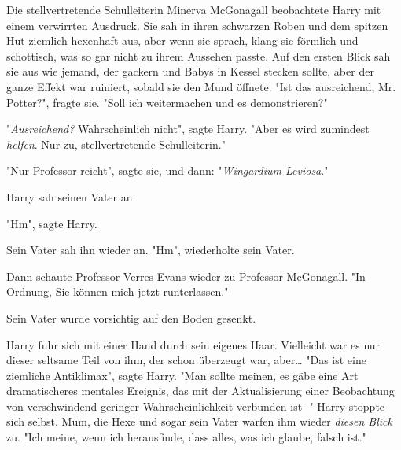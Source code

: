 Die stellvertretende Schulleiterin Minerva McGonagall beobachtete Harry mit einem verwirrten Ausdruck. Sie sah in ihren schwarzen Roben und dem spitzen Hut ziemlich hexenhaft aus, aber wenn sie sprach, klang sie förmlich und schottisch, was so gar nicht zu ihrem Aussehen passte. Auf den ersten Blick sah sie aus wie jemand, der gackern und Babys in Kessel stecken sollte, aber der ganze Effekt war ruiniert, sobald sie den Mund öffnete.
"Ist das ausreichend, Mr. Potter?", fragte sie. "Soll ich weitermachen und es demonstrieren?"

"\emph{Ausreichend?} Wahrscheinlich nicht", sagte Harry. "Aber es wird zumindest \emph{helfen}. Nur zu, stellvertretende Schulleiterin."

"Nur Professor reicht", sagte sie, und dann: "\emph{Wingardium Leviosa}."

Harry sah seinen Vater an.

"Hm", sagte Harry.

Sein Vater sah ihn wieder an. "Hm", wiederholte sein Vater.

Dann schaute Professor Verres-Evans wieder zu Professor McGonagall. "In Ordnung, Sie können mich jetzt runterlassen."

Sein Vater wurde vorsichtig auf den Boden gesenkt.

Harry fuhr sich mit einer Hand durch sein eigenes Haar. Vielleicht war es nur dieser seltsame Teil von ihm, der schon überzeugt war, aber… "Das ist eine ziemliche Antiklimax", sagte Harry. "Man sollte meinen, es gäbe eine Art dramatischeres mentales Ereignis, das mit der Aktualisierung einer Beobachtung von verschwindend geringer Wahrscheinlichkeit verbunden ist -" Harry stoppte sich selbst. Mum, die Hexe und sogar sein Vater warfen ihm wieder \emph{diesen Blick} zu. "Ich meine, wenn ich herausfinde, dass alles, was ich glaube, falsch ist."

